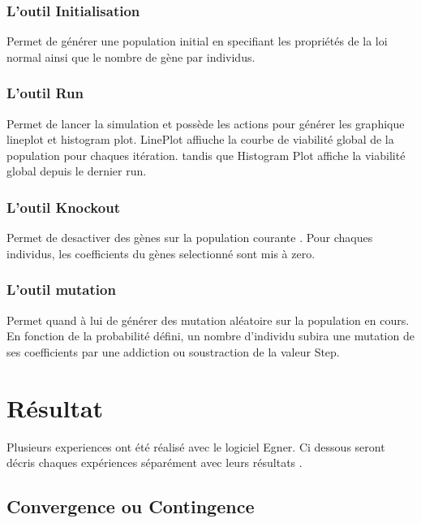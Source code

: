 \documentclass{article}
\begin{document}
	\subsubsection {L'outil Initialisation}
	Permet de générer une population initial en specifiant les propriétés de la loi normal ainsi que le nombre de gène par individus.
	\subsubsection{ L'outil Run}
	Permet de lancer la simulation et possède les actions pour générer les graphique lineplot et histogram plot. LinePlot affiuche la courbe de viabilité global de la population pour chaques itération. tandis que Histogram Plot affiche la viabilité global depuis le dernier run. 
	\subsubsection{L'outil Knockout}
	Permet de desactiver des gènes sur la population courante . Pour chaques individus, les coefficients du gènes selectionné sont mis à zero. 
	\subsubsection{L'outil mutation}
	Permet quand à lui de générer des mutation aléatoire sur la population en cours. En fonction de la probabilité défini, un nombre d'individu subira une mutation de ses coefficients par une addiction ou soustraction de la valeur Step.

	


	\section {Résultat}
	Plusieurs experiences ont été réalisé avec le logiciel Egner. Ci dessous seront décris chaques expériences séparément avec leurs résultats .

	\subsection{Convergence ou Contingence}
\end{document}
